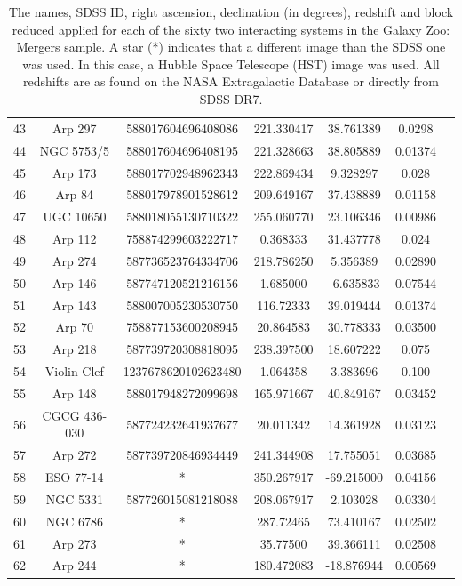 \begin{table}
{\begin{tabular}{|c|c|c|c|c|c|c|}
         43 & Arp 297 & 588017604696408086 & 221.330417 & 38.761389 & 0.0298 \\
         44 & NGC 5753/5 & 588017604696408195 & 221.328663 & 38.805889 & 0.01374 \\
         45 & Arp 173 & 588017702948962343 & 222.869434 & 9.328297 & 0.028 \\
         46 & Arp 84 & 588017978901528612 & 209.649167 & 37.438889 & 0.01158 \\
         47 & UGC 10650 & 588018055130710322 & 255.060770 & 23.106346 & 0.00986 \\
         48 & Arp 112 & 758874299603222717 & 0.368333 & 31.437778 & 0.024 \\
         49 & Arp 274 & 587736523764334706 & 218.786250 & 5.356389 & 0.02890 \\
         50 & Arp 146 & 587747120521216156 & 1.685000 & -6.635833 & 0.07544 \\
         51 & Arp 143 & 588007005230530750 & 116.72333 & 39.019444 & 0.01374 \\
         52 & Arp 70 & 758877153600208945 & 20.864583 & 30.778333 & 0.03500 \\
         53 & Arp 218 & 587739720308818095 & 238.397500 & 18.607222 & 0.075 \\
         54 & Violin Clef & 1237678620102623480 & 1.064358 & 3.383696 & 0.100 \\
         55 & Arp 148 & 588017948272099698 & 165.971667 & 40.849167 & 0.03452 \\
         56 & CGCG 436-030 & 587724232641937677 & 20.011342 & 14.361928 & 0.03123 \\
         57 & Arp 272 & 587739720846934449 & 241.344908 & 17.755051 & 0.03685 \\
         58 & ESO 77-14 & * & 350.267917 & -69.215000 & 0.04156 \\
         59 & NGC 5331 & 587726015081218088 & 208.067917 & 2.103028 & 0.03304 \\
         60 & NGC 6786 & * & 287.72465 & 73.410167 & 0.02502 \\
         61 & Arp 273 & * & 35.77500 & 39.366111 & 0.02508 \\
         62 & Arp 244 & * & 180.472083 & -18.876944 & 0.00569 \\
         \hline
    \end{tabular}}
    \caption{The names, SDSS ID, right ascension, declination (in degrees), redshift and block reduced applied for each of the sixty two interacting systems in the Galaxy Zoo: Mergers sample. A star (*) indicates that a different image than the SDSS one was used. In this case, a Hubble Space Telescope (HST) image was used. All redshifts are as found on the NASA Extragalactic Database or directly from SDSS DR7.}
    \label{tab:Objects}
\end{table}

